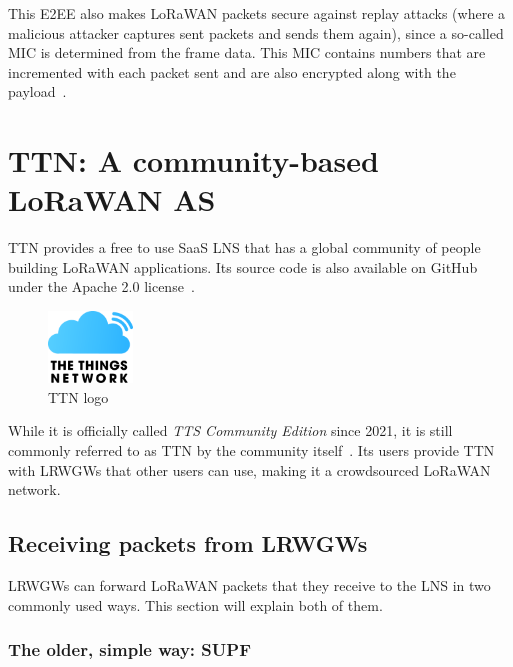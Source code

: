 This \ac{E2EE} also makes \ac{LoRaWAN} packets secure against replay attacks (where a malicious attacker captures sent packets and sends them again), since a so-called \ac{MIC} is determined from the frame data.
This \ac{MIC} contains numbers that are incremented with each packet sent and are also encrypted along with the payload~\cite[p. 22f.]{lora_alliance_inc_lorawan_specification_2017}.

\section{\acl{TTN}: A community-based \acs{LoRaWAN} \acl{AS}}

\ac{TTN} provides a free to use \ac{SaaS} \ac{LNS} that has a global community of people building \ac{LoRaWAN} applications.
Its source code is also available on GitHub under the Apache 2.0 license~\cite{the_things_network_thethingsnetworklorawan-stack_2023}.

\begin{figure}[htbp]
    \centering
    \includegraphics[width=0.2\textwidth]{pictures/logos/TTN-logo.eps}
    \caption[\acl{TTN} logo]{\acf{TTN} logo~\protect\cite{the_things_industries_bv_quick_nodate}}
\end{figure}


While it is officially called \emph{\acl{TTS} Community Edition} since 2021, it is still commonly referred to as \acf{TTN} by the community itself~\cite{the_things_industries_bv_what_2022}.
Its users provide \ac{TTN} with \aclp{LRWGW} that other users can use, making it a crowdsourced \ac{LoRaWAN} network.

\subsection{Receiving packets from \aclp{LRWGW}}

\aclp{LRWGW} can forward \ac{LoRaWAN} packets that they receive to the \ac{LNS} in two commonly used ways.
This section will explain both of them.

\subsubsection{The older, simple way: \acl{SUPF}}

